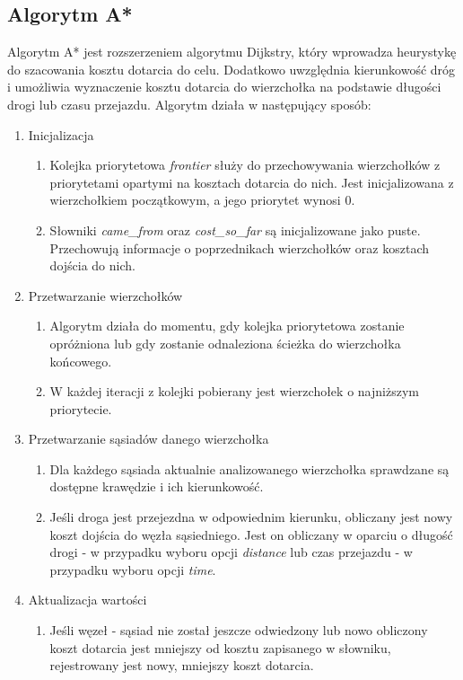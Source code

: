 \documentclass{article}
\begin{document}
\subsection{Algorytm A*}
Algorytm A* jest rozszerzeniem algorytmu Dijkstry, który wprowadza heurystykę do szacowania kosztu dotarcia do celu. Dodatkowo uwzględnia kierunkowość dróg i umożliwia wyznaczenie kosztu dotarcia do wierzchołka na podstawie długości drogi lub czasu przejazdu.
Algorytm działa w następujący sposób:
\begin{enumerate}
    \item Inicjalizacja 
    \begin{enumerate}
        \item Kolejka priorytetowa \textit{frontier} służy do przechowywania wierzchołków z priorytetami opartymi na kosztach dotarcia do nich. Jest inicjalizowana z wierzchołkiem początkowym, a jego priorytet wynosi 0.
        \item Słowniki \textit{came\_from} oraz \textit{cost\_so\_far} są inicjalizowane jako puste. Przechowują informacje o poprzednikach wierzchołków oraz kosztach dojścia do nich.
    \end{enumerate}
    \item Przetwarzanie wierzchołków
    \begin{enumerate}
        \item Algorytm działa do momentu, gdy kolejka priorytetowa zostanie opróżniona lub gdy zostanie odnaleziona ścieżka do wierzchołka końcowego.
        \item W każdej iteracji z kolejki pobierany jest wierzchołek o najniższym priorytecie.
    \end{enumerate}
    \item Przetwarzanie sąsiadów danego wierzchołka
    \begin{enumerate}
        \item Dla każdego sąsiada aktualnie analizowanego wierzchołka sprawdzane są dostępne krawędzie i ich kierunkowość.
        \item Jeśli droga jest przejezdna w odpowiednim kierunku, obliczany jest nowy koszt dojścia do węzła sąsiedniego.
        Jest on obliczany w oparciu o długość drogi - w przypadku wyboru opcji \textit{distance} lub czas przejazdu - w przypadku wyboru opcji \textit{time}.
    \end{enumerate}
    \item Aktualizacja wartości
    \begin{enumerate}
        \item Jeśli węzeł - sąsiad nie został jeszcze odwiedzony lub nowo obliczony koszt dotarcia jest mniejszy od kosztu zapisanego w słowniku, rejestrowany jest nowy, mniejszy koszt dotarcia.

\end{enumerate}
\end{enumerate}
\end{document}
